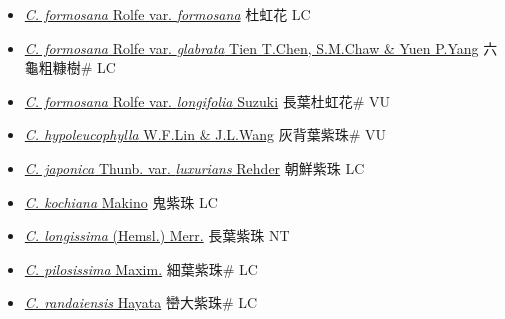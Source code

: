 \begin{itemize}
  \begin{itemize}
        \item[] \href{http://www.theplantlist.org/tpl1.1/search?q=Callicarpa+formosana+var.+formosana}{\textit{C. formosana} Rolfe var. \textit{formosana}}   杜虹花 LC
        \item[] \href{http://www.theplantlist.org/tpl1.1/search?q=Callicarpa+formosana+var.+glabrata}{\textit{C. formosana} Rolfe var. \textit{glabrata} Tien T.Chen, S.M.Chaw \& Yuen P.Yang}   六龜粗糠樹\# LC
        \item[] \href{http://www.theplantlist.org/tpl1.1/search?q=Callicarpa+formosana+var.+longifolia}{\textit{C. formosana} Rolfe var. \textit{longifolia} Suzuki}   長葉杜虹花\# VU
        \item[] \href{http://www.theplantlist.org/tpl1.1/search?q=Callicarpa+hypoleucophylla}{\textit{C. hypoleucophylla} W.F.Lin \& J.L.Wang}   灰背葉紫珠\# VU
        \item[] \href{http://www.theplantlist.org/tpl1.1/search?q=Callicarpa+japonica+var.+luxurians}{\textit{C. japonica} Thunb. var. \textit{luxurians} Rehder}   朝鮮紫珠 LC
        \item[] \href{http://www.theplantlist.org/tpl1.1/search?q=Callicarpa+kochiana}{\textit{C. kochiana} Makino}   鬼紫珠 LC
        \item[] \href{http://www.theplantlist.org/tpl1.1/search?q=Callicarpa+longissima}{\textit{C. longissima} (Hemsl.) Merr.}   長葉紫珠 NT
        \item[] \href{http://www.theplantlist.org/tpl1.1/search?q=Callicarpa+pilosissima}{\textit{C. pilosissima} Maxim.}   細葉紫珠\# LC
        \item[] \href{http://www.theplantlist.org/tpl1.1/search?q=Callicarpa+randaiensis}{\textit{C. randaiensis} Hayata}   巒大紫珠\# LC

\end{itemize}
\end{itemize}
